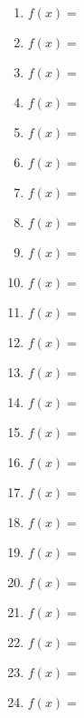 \documentclass[a4paper,10pt]{article}
\begin{document}
\begin{multicols}{3}
\begin{enumerate}
\item $f(x) = $
\item $f(x) = $
\item $f(x) = $
\item $f(x) = $

\item $f(x) = $
\item $f(x) = $
\item $f(x) = $
\item $f(x) = $

\item $f(x) = $
\item $f(x) = $
\item $f(x) = $
\item $f(x) = $

\item $f(x) = $
\item $f(x) = $
\item $f(x) = $
\item $f(x) = $

\item $f(x) = $
\item $f(x) = $
\item $f(x) = $
\item $f(x) = $

\item $f(x) = $
\item $f(x) = $
\item $f(x) = $
\item $f(x) = $
\end{enumerate}
\end{multicols}
\end{document}
